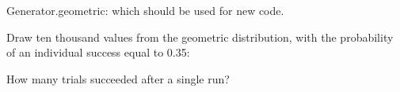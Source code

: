 \documentclass[letterpaper,10pt,english]{sphinxmanual}
\begin{document}
\begin{fulllineitems}
Generator.geometric: which should be used for new code.

Draw ten thousand values from the geometric distribution,
with the probability of an individual success equal to 0.35:

\begin{sphinxVerbatim}[commandchars=\\\{\}]
   
\end{sphinxVerbatim}

How many trials succeeded after a single run?

\begin{sphinxVerbatim}[commandchars=\\\{\}]
    
\end{sphinxVerbatim}

\end{fulllineitems}

\end{document}
